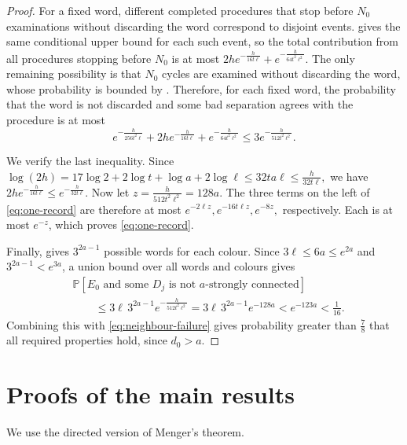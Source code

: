 \documentclass[11pt,a4paper]{article}
\theoremstyle{remark}
\numberwithin{equation}{section}
\newcommand{\Prob}{\mathbb{P}}
\begin{document}
\begin{proof}
		For a fixed word, different completed procedures that stop before $N_0$
		examinations without discarding the word correspond to disjoint events.
		 gives the same conditional upper bound for each such
		event, so the total contribution from all procedures stopping before $N_0$ is at
		most
		$
		2he^{-\frac{h}{16t\ell}}+e^{-\frac{h}{64t^2\ell^2}}.
		$
		The only remaining possibility is that $N_0$ cycles are examined without
		discarding the word, whose probability is bounded by
		. Therefore, for each fixed word, the probability
		that the word is not discarded and some bad separation agrees with
		the procedure is at most
		\begin{equation}\label{eq:one-record}
			e^{-\frac{h}{256t^2\ell}}
			+2he^{-\frac{h}{16t\ell}}
			+e^{-\frac{h}{64t^2\ell^2}}
			\le3e^{-\frac{h}{512t^2\ell^2}}.
		\end{equation}
		
		We verify the last inequality. Since
		$
		\log(2h)
		=17\log2+2\log t+\log a+2\log\ell
		\le32ta\ell
		\le\frac{h}{32t\ell},
		$
		we have
		$
		2he^{-\frac{h}{16t\ell}}
		\le e^{-\frac{h}{32t\ell}}.
		$
		Now let
		$
		z=\frac{h}{512t^2\ell^2}=128a.
		$
		The three terms on the left of \eqref{eq:one-record} are therefore at most
		$
		e^{-2\ell z}, e^{-16t\ell z}, e^{-8z},
		$
		respectively. Each is at most $e^{-z}$, which proves
		\eqref{eq:one-record}.
		
		Finally,  gives $3^{2a-1}$ possible words for each
		colour. Since $3\ell\le6a\le e^{2a}$ and
		$3^{2a-1}<e^{3a}$, a union bound over all words and colours gives
		\[
			\begin{aligned}
				&\Prob\!\left[E_0\text{ and some }D_j\text{ is not $a$-strongly connected}\right]\\
				&\qquad\le
				3\ell\,3^{2a-1}e^{-\frac{h}{512t^2\ell^2}}
				=3\ell\,3^{2a-1}e^{-128a}
				<e^{-123a}<\frac{1}{16}.
			\end{aligned}
	    \]
		Combining this with \eqref{eq:neighbour-failure} gives probability greater than
		$\frac{7}{8}$ that all required properties hold, since $d_0>a$.
	\end{proof}
	
    \section{Proofs of the main results}\label{sec:proofs}
	
	We use the directed version of Menger's theorem.
	
\end{document}

